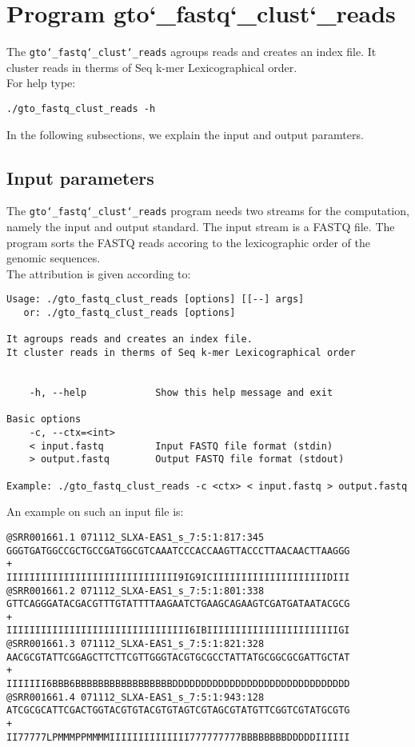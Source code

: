\section{Program gto\char`_fastq\char`_clust\char`_reads}
The \texttt{gto\char`_fastq\char`_clust\char`_reads} agroups reads and creates an index file. It cluster reads in therms of Seq k-mer Lexicographical order.\\
For help type:
\begin{lstlisting}
./gto_fastq_clust_reads -h
\end{lstlisting}
In the following subsections, we explain the input and output paramters.

\subsection*{Input parameters}

The \texttt{gto\char`_fastq\char`_clust\char`_reads} program needs two streams for the computation, namely the input and output standard. The input stream is a FASTQ file. The program sorts the FASTQ reads accoring to the lexicographic order of the genomic sequences.\\
The attribution is given according to:
\begin{lstlisting}
Usage: ./gto_fastq_clust_reads [options] [[--] args]
   or: ./gto_fastq_clust_reads [options]

It agroups reads and creates an index file.
It cluster reads in therms of Seq k-mer Lexicographical order


    -h, --help            Show this help message and exit

Basic options
    -c, --ctx=<int>       
    < input.fastq         Input FASTQ file format (stdin)
    > output.fastq        Output FASTQ file format (stdout)

Example: ./gto_fastq_clust_reads -c <ctx> < input.fastq > output.fastq
\end{lstlisting}
An example on such an input file is:
\begin{lstlisting}
@SRR001661.1 071112_SLXA-EAS1_s_7:5:1:817:345
GGGTGATGGCCGCTGCCGATGGCGTCAAATCCCACCAAGTTACCCTTAACAACTTAAGGG
+
IIIIIIIIIIIIIIIIIIIIIIIIIIIIII9IG9ICIIIIIIIIIIIIIIIIIIIIDIII
@SRR001661.2 071112_SLXA-EAS1_s_7:5:1:801:338
GTTCAGGGATACGACGTTTGTATTTTAAGAATCTGAAGCAGAAGTCGATGATAATACGCG
+
IIIIIIIIIIIIIIIIIIIIIIIIIIIIIIII6IBIIIIIIIIIIIIIIIIIIIIIIIGI
@SRR001661.3 071112_SLXA-EAS1_s_7:5:1:821:328
AACGCGTATTCGGAGCTTCTTCGTTGGGTACGTGCGCCTATTATGCGGCGCGATTGCTAT
+
IIIIIII6BBB6BBBBBBBBBBBBBBBBBDDDDDDDDDDDDDDDDDDDDDDDDDDDDDDD
@SRR001661.4 071112_SLXA-EAS1_s_7:5:1:943:128
ATCGCGCATTCGACTGGTACGTGTACGTGTAGTCGTAGCGTATGTTCGGTCGTATGCGTG
+
II77777LPMMMPPMMMMIIIIIIIIIIIIII777777777BBBBBBBBDDDDDIIIIII
\end{lstlisting}

